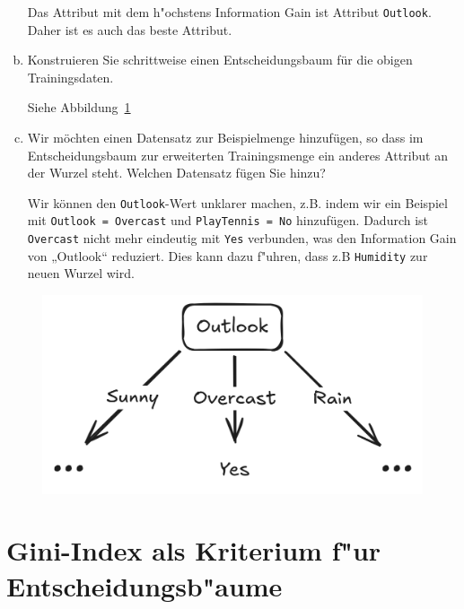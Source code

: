 \documentclass[10pt, oneside]{article}
\begin{document}
\begin{enumerate}[(a)]
    Das Attribut mit dem h"ochstens Information Gain ist Attribut
    \verb|Outlook|. Daher ist es auch das beste Attribut.

    \item Konstruieren Sie schrittweise einen Entscheidungsbaum für die obigen Trainingsdaten.

        Siehe Abbildung~\ref{fig:02-b}

    \item Wir möchten einen Datensatz zur Beispielmenge hinzufügen, so dass im
        Entscheidungsbaum zur erweiterten Trainingsmenge ein anderes Attribut
        an der Wurzel steht. Welchen Datensatz fügen Sie hinzu?

        Wir können den \verb|Outlook|-Wert unklarer machen, z.B. indem wir ein
        Beispiel mit \verb|Outlook = Overcast| und \verb|PlayTennis = No|
        hinzufügen. Dadurch ist \verb|Overcast| nicht mehr eindeutig mit
        \verb|Yes| verbunden, was den Information Gain von „Outlook“ reduziert.
        Dies kann dazu f"uhren, dass z.B \verb|Humidity| zur neuen Wurzel wird.

\end{enumerate}

\begin{figure}[p]
    \centering
    \includegraphics[width=1\textwidth]{./assets/02-b.png}
    \caption{}
    \label{fig:02-b}
\end{figure}

\FloatBarrier

\section{Gini-Index als Kriterium f"ur Entscheidungsb"aume}
\end{document}
